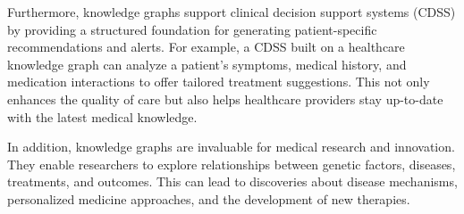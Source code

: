 \begin{itemize}
    Furthermore, knowledge graphs support clinical decision support systems (CDSS) by providing a structured foundation for generating patient-specific recommendations and alerts. For example, a CDSS built on a healthcare knowledge graph can analyze a patient's symptoms, medical history, and medication interactions to offer tailored treatment suggestions. This not only enhances the quality of care but also helps healthcare providers stay up-to-date with the latest medical knowledge.
    
    In addition, knowledge graphs are invaluable for medical research and innovation. They enable researchers to explore relationships between genetic factors, diseases, treatments, and outcomes. This can lead to discoveries about disease mechanisms, personalized medicine approaches, and the development of new therapies.
    
\end{itemize}

    

    
